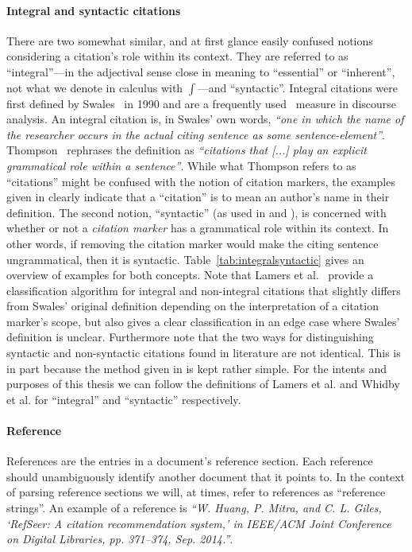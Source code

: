 \paragraph{Integral and syntactic citations} There are two somewhat similar, and at first glance easily confused notions considering a citation's role within its context. They are referred to as ``integral''---in the adjectival sense close in meaning to ``essential'' or ``inherent'', not what we denote in calculus with $\int$---and ``syntactic''. Integral citations were first defined by Swales~\cite{Swales1990} in 1990 and are a frequently used~\cite{Hyland1999,Thompson2001,Okamura2008,Lamers2018} measure in discourse analysis. An integral citation is, in Swales' own words, \emph{``one in which the name of the researcher occurs in the actual citing sentence as some sentence-element''}. Thompson~\cite{Thompson2001} rephrases the definition as \emph{``citations that [...] play an explicit grammatical role within a sentence''}. While what Thompson refers to as ``citations'' might be confused with the notion of citation markers, the examples given in \cite{Thompson2001} clearly indicate that a ``citation'' is to mean an author's name in their definition. The second notion, ``syntactic'' (as used in \cite{Whidby2011} and \cite{Abujbara2012}), is concerned with whether or not a \emph{citation marker} has a grammatical role within its context. In other words, if removing the citation marker would make the citing sentence ungrammatical, then it is syntactic. Table~\ref{tab:integralsyntactic} gives an overview of examples for both concepts. Note that Lamers et al.~\cite{Lamers2018} provide a classification algorithm for integral and non-integral citations that slightly differs from Swales' original definition depending on the interpretation of a citation marker's scope, but also gives a clear classification in an edge case where Swales' definition is unclear. Furthermore note that the two ways for distinguishing syntactic and non-syntactic citations found in literature are not identical. This is in part because the method given in \cite{Abujbara2012} is kept rather simple. For the intents and purposes of this thesis we can follow the definitions of Lamers et al. and Whidby et al. for ``integral'' and ``syntactic'' respectively.
\paragraph{Reference} References are the entries in a document's reference section. Each reference should unambiguously identify another document that it points to. In the context of parsing reference sections we will, at times, refer to references as ``reference strings''. An example of a reference is \emph{``W. Huang, P. Mitra, and C. L. Giles, `RefSeer: A citation recommendation system,' in IEEE/ACM Joint Conference on Digital Libraries, pp. 371–374, Sep. 2014.''}.

